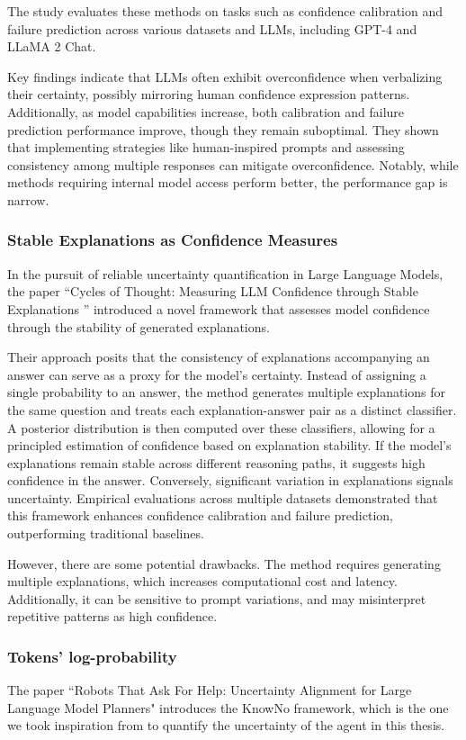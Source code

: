 The study evaluates these methods on tasks such as confidence calibration and
failure prediction across various datasets and LLMs, including GPT-4 and LLaMA 2
Chat.

Key findings indicate that LLMs often exhibit overconfidence when verbalizing their
certainty, possibly mirroring human confidence expression patterns. Additionally,
as model capabilities increase, both calibration and failure prediction performance
improve, though they remain suboptimal. They shown that implementing strategies like
human-inspired prompts and assessing consistency among multiple responses can mitigate
overconfidence. Notably, while methods requiring internal model access perform better,
the performance gap is narrow.

\subsubsection{Stable Explanations as Confidence Measures}
In the pursuit of reliable uncertainty quantification in Large Language Models, the
paper ``Cycles of Thought: Measuring LLM Confidence through Stable Explanations
'' \cite{becker2024cyclesthoughtmeasuringllm} introduced a novel framework that assesses
model confidence through the stability of generated explanations.

Their approach posits that the consistency of explanations accompanying an answer
can serve as a proxy for the model's certainty. Instead of assigning a single
probability to an answer, the method generates multiple explanations for the same
question and treats each explanation-answer pair as a distinct classifier. A
posterior distribution is then computed over these classifiers, allowing for a principled
estimation of confidence based on explanation stability. If the model's
explanations remain stable across different reasoning paths, it suggests high confidence
in the answer. Conversely, significant variation in explanations signals uncertainty.
Empirical evaluations across multiple datasets demonstrated that this framework
enhances confidence calibration and failure prediction, outperforming traditional
baselines.

However, there are some potential drawbacks. The method requires generating multiple
explanations, which increases computational cost and latency. Additionally, it
can be sensitive to prompt variations, and may misinterpret repetitive patterns as
high confidence.

\subsubsection{Tokens' log-probability}
\label{ssub:tokens_log_probability} The paper ``Robots That Ask For Help:
Uncertainty Alignment for Large Language Model Planners" \cite{ren2023robotsaskhelpuncertainty}
introduces the KnowNo framework, which is the one we took inspiration from to
quantify the uncertainty of the agent in this thesis.

